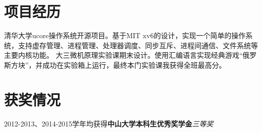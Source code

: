   \resumeSubHeadingListEnd

\section{项目经历}
  \resumeSubHeadingListStart
      {清华大学ucore操作系统开源项目。基于MIT xv6的设计，实现一个简单的操作系统，支持虚存管理、进程管理、处理器调度、同步互斥、进程间通信、文件系统等主要内核功能。}
      {大三微机原理实验课期末设计。使用汇编语言实现经典游戏“俄罗斯方块”，并成功在实验箱上运行，最终本门实验课我获得全班最高分。}
  \resumeSubHeadingListEnd

\section{获奖情况}
  \resumeSubHeadingListStart
  \small
    \item{2012-2013、2014-2015学年均获得\textbf{中山大学本科生优秀奖学金}\textit{三等奖}}
  \resumeSubHeadingListEnd

